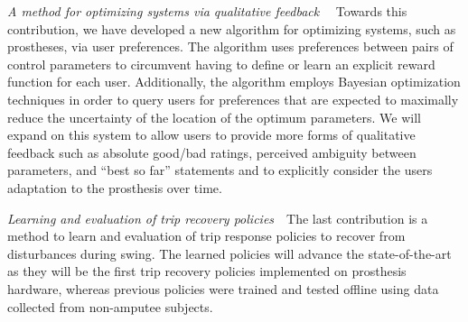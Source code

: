 \begin{contributions}
    \item\label{contrib:pref_opt} \emph{A method for optimizing systems via
    qualitative feedback}~~ Towards this contribution, we have developed a new
    algorithm for optimizing systems, such as prostheses, via user preferences.
    The algorithm uses preferences between pairs of control parameters to
    circumvent having to define or learn an explicit reward function for each
    user. Additionally, the algorithm employs Bayesian optimization techniques
    in order to query users for preferences that are expected to maximally
    reduce the uncertainty of the location of the optimum parameters. We will
    expand on this system to allow users to provide more forms of qualitative
    feedback such as absolute good/bad ratings, perceived ambiguity between
    parameters, and ``best so far'' statements and to explicitly consider the
    users adaptation to the prosthesis over time.

    \item\label{contrib:trip_recovery} \emph{Learning and evaluation of trip
    recovery policies}~~The last contribution is a method to learn and
    evaluation of trip response policies to recover from disturbances during
    swing. The learned policies will advance the state-of-the-art as they will
    be the first trip recovery policies implemented on prosthesis hardware,
    whereas previous policies were trained and tested offline using data
    collected from non-amputee subjects.
\end{contributions}
